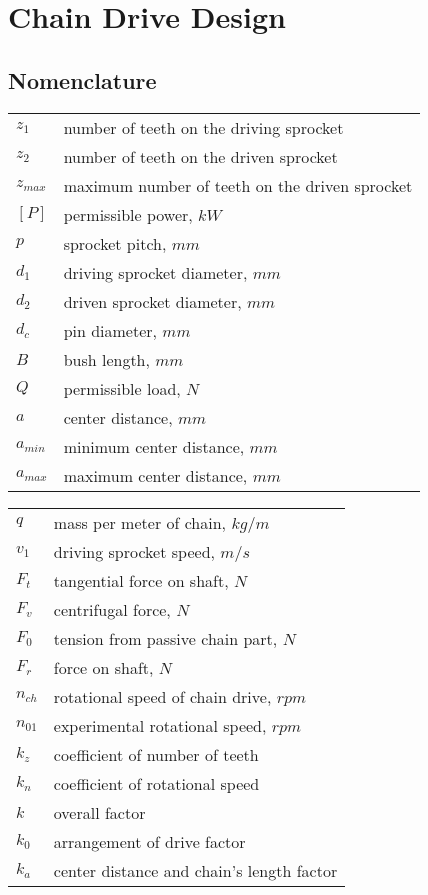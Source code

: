 \chapter{Chain Drive Design}
\section{Nomenclature}
\begin{tabular}[t]{lp{7cm}}
		$ z_1 $ & number of teeth on the driving sprocket\\
		$ z_2 $ & number of teeth on the driven sprocket\\
		$ z_{max} $ & maximum number of teeth on the driven sprocket\\
		$ [P] $ & permissible power, $ \unit{kW} $\\
		$ p $ & sprocket pitch, $ \unit{mm} $\\
		$ d_1 $ & driving sprocket diameter, $ \unit{mm} $\\
		$ d_2 $ & driven sprocket diameter, $ \unit{mm} $\\
		$ d_c $ & pin diameter, $ \unit{mm} $\\
		$ B $ & bush length, $ \unit{mm} $\\
		$ Q $ & permissible load, $ \unit{N} $\\
		$ a $ & center distance, $ \unit{mm} $\\
		$ a_{min} $ & minimum center distance, $ \unit{mm} $\\
		$ a_{max} $ & maximum center distance, $ \unit{mm} $\\
\end{tabular}
\begin{tabular}[t]{lp{7cm}}
		
		$ q $ & mass per meter of chain, $ \unit{kg/m} $\\
		$ v_1 $ & driving sprocket speed, $ \unit{m/s} $\\
		$ F_t $ & tangential force on shaft, $ \unit{N} $\\
		$ F_v $ & centrifugal force, $ \unit{N} $\\
		$ F_0 $ & tension from passive chain part, $ \unit{N} $\\
		$ F_r $ & force on shaft, $ \unit{N} $\\
		$ n_{ch} $ & rotational speed of chain drive, $ \unit{rpm} $\\
		$ n_{01} $ & experimental rotational speed, $ \unit{rpm} $\\
		$ k_z $ & coefficient of number of teeth\\
		$ k_n $ & coefficient of rotational speed\\
		$ k $ & overall factor\\
		$ k_0 $ & arrangement of drive factor\\
		$ k_a $ & center distance and chain's length factor\\			
\end{tabular}\newpage
